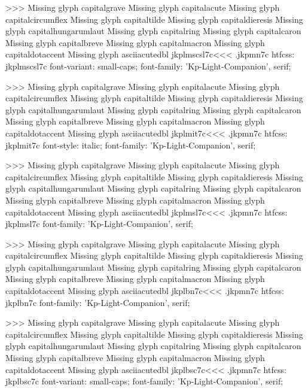 >>>
Missing glyph	capitalgrave
Missing glyph	capitalacute
Missing glyph	capitalcircumflex
Missing glyph	capitaltilde
Missing glyph	capitaldieresis
Missing glyph	capitalhungarumlaut
Missing glyph	capitalring
Missing glyph	capitalcaron
Missing glyph	capitalbreve
Missing glyph	capitalmacron
Missing glyph	capitaldotaccent
Missing glyph	asciiacutedbl
\<jkplmscsl7c\><<<
.jkpmn7c
htfcss:  jkplmscsl7c  font-variant: small-caps; font-family: 'Kp-Light-Companion', serif;

>>>
Missing glyph	capitalgrave
Missing glyph	capitalacute
Missing glyph	capitalcircumflex
Missing glyph	capitaltilde
Missing glyph	capitaldieresis
Missing glyph	capitalhungarumlaut
Missing glyph	capitalring
Missing glyph	capitalcaron
Missing glyph	capitalbreve
Missing glyph	capitalmacron
Missing glyph	capitaldotaccent
Missing glyph	asciiacutedbl
\<jkplmit7c\><<<
.jkpmn7c
htfcss:  jkplmit7c  font-style: italic; font-family: 'Kp-Light-Companion', serif;

>>>
Missing glyph	capitalgrave
Missing glyph	capitalacute
Missing glyph	capitalcircumflex
Missing glyph	capitaltilde
Missing glyph	capitaldieresis
Missing glyph	capitalhungarumlaut
Missing glyph	capitalring
Missing glyph	capitalcaron
Missing glyph	capitalbreve
Missing glyph	capitalmacron
Missing glyph	capitaldotaccent
Missing glyph	asciiacutedbl
\<jkplmsl7c\><<<
.jkpmn7c
htfcss:  jkplmsl7c  font-family: 'Kp-Light-Companion', serif;

>>>
Missing glyph	capitalgrave
Missing glyph	capitalacute
Missing glyph	capitalcircumflex
Missing glyph	capitaltilde
Missing glyph	capitaldieresis
Missing glyph	capitalhungarumlaut
Missing glyph	capitalring
Missing glyph	capitalcaron
Missing glyph	capitalbreve
Missing glyph	capitalmacron
Missing glyph	capitaldotaccent
Missing glyph	asciiacutedbl
\<jkplbn7c\><<<
.jkpmn7c
htfcss:  jkplbn7c  font-family: 'Kp-Light-Companion', serif;

>>>
Missing glyph	capitalgrave
Missing glyph	capitalacute
Missing glyph	capitalcircumflex
Missing glyph	capitaltilde
Missing glyph	capitaldieresis
Missing glyph	capitalhungarumlaut
Missing glyph	capitalring
Missing glyph	capitalcaron
Missing glyph	capitalbreve
Missing glyph	capitalmacron
Missing glyph	capitaldotaccent
Missing glyph	asciiacutedbl
\<jkplbsc7c\><<<
.jkpmn7c
htfcss:  jkplbsc7c  font-variant: small-caps; font-family: 'Kp-Light-Companion', serif;

